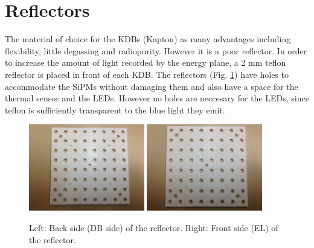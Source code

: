 \section{Reflectors}

The material of choice for the KDBs (Kapton) as many advantages including flexibility, little degassing and radiopurity. However it is a poor reflector. In order to increase the amount of light recorded by the energy plane, a 2 mm teflon reflector is placed in front of each KDB. The reflectors (Fig. \ref{fig:reflector}) have holes to accommodate the SiPMs without damaging them and also have a space for the thermal sensor and the LEDs. However no holes are neccesary for the LEDs, since teflon is sufficiently transparent to the blue light they emit. 
\begin{figure}[h!]
\centering
\includegraphics[width=0.45\textwidth]{IMG/teflon1}
\includegraphics[width=0.45\textwidth]{IMG/teflon2}
\caption{Left: Back side (DB side) of the reflector. Right: Front side (EL) of the reflector.}
\label{fig:reflector}
\end{figure}

